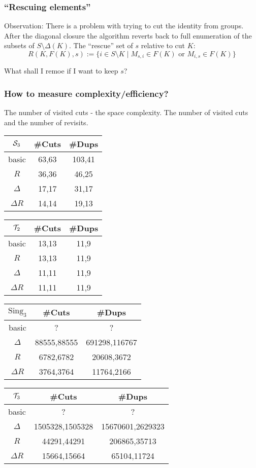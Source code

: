 \documentclass{beamer}
\newcommand{\cS}{{\cal S}}
\newcommand{\cT}{{\cal T}}
\newcommand{\jump}{\vskip6pt}
\begin{document}
\begin{frame}\frametitle{``Rescuing elements''}
Observation: There is a problem with trying to cut the identity from groups. After the diagonal closure the algorithm reverts back to full enumeration of the subsets of $S\setminus \Delta(K)$.
\jump
The ``rescue'' set of $s$ relative to cut $K$:
$$ R(K,F(K),s):=\{i\in S\setminus K\mid M_{s,i}\in F(K) \text{ or } M_{i,s}\in F(K)\}$$

What shall I remoe if I want to keep $s$?

\end{frame}

\begin{frame}\frametitle{How to measure complexity/efficiency?}
The number of visited cuts - the space complexity.
\jump
The number of visited cuts and the number of revisits.
\jump
\begin{tabular}{c|cc}
$\cS_3$ & \#Cuts & \#Dups \\
\hline
basic  & 63,63 & 103,41\\
$R$ &36,36 & 46,25\\
$\Delta$ & 17,17 & 31,17 \\
$\Delta R$ & 14,14 & 19,13
\end{tabular}
\jump

\begin{tabular}{c|cc}
$\cT_2$ & \#Cuts & \#Dups \\
\hline
basic  & 13,13 & 11,9\\
$R$ &13,13 & 11,9\\
$\Delta$ & 11,11 & 11,9 \\
$\Delta R$ & 11,11 & 11,9
\end{tabular}
\end{frame}

\begin{frame}
\begin{tabular}{c|cc}
$\text{Sing}_3$ & \#Cuts & \#Dups \\
\hline
basic  & ? & ?\\
$\Delta$ & 88555,88555 & 691298,116767 \\
$R$ &6782,6782 & 20608,3672\\
$\Delta R$ & 3764,3764 & 11764,2166
\end{tabular}
\jump
\begin{tabular}{c|cc}
$\cT_3$ & \#Cuts & \#Dups \\
\hline
basic  & ? & ?\\
$\Delta$ & 1505328,1505328 & 15670601,2629323 \\
$R$ & 44291,44291 & 206865,35713\\
$\Delta R$ &15664,15664 & 65104,11724
\end{tabular}

\end{frame}
\end{document}
